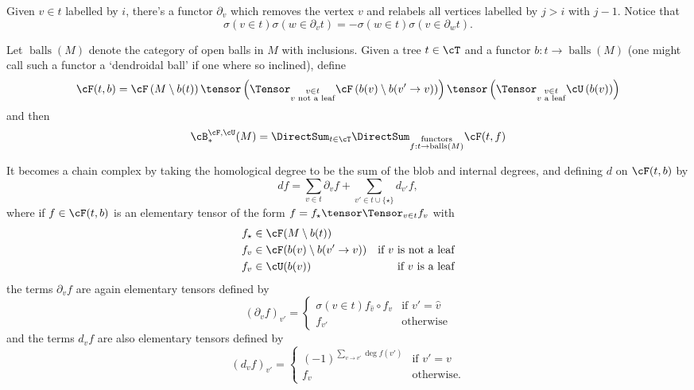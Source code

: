 Given $v \in t$ labelled by $i$, there's a functor $\partial_v$ which removes the vertex $v$ and relabels all vertices labelled by $j>i$ with $j-1$. Notice that $$\sigma(v \in t) \sigma(w \in \partial_v t) = - \sigma(w \in t) \sigma(v \in \partial_w t).$$

Let $\operatorname{balls}(M)$ denote the category of open balls in $M$ with inclusions.
Given a tree $t \in \cT$ and a functor $b : t \to \operatorname{balls}(M)$ (one might call such a functor a `dendroidal ball' if one where so inclined), define  
\begin{equation*}
\cF(t,b) = \cF\left(M \setminus b(t)\right) \tensor \left(\Tensor_{\substack{v \in t \\ \text{$v$ not a leaf}}} \cF\left(b(v) \setminus b(v' \to v)\right)\right) \tensor \left(\Tensor_{\substack{v \in t \\ \text{$v$ a leaf}}} \cU\left(b(v)\right)\right)
\end{equation*}
and then
\begin{equation*}
\cB_*^{\cF,\cU}(M) = \DirectSum_{t \in \cT} \DirectSum_{\substack{\text{functors} \\ f: t \to \operatorname{balls}(M)}} \cF(t,f)
\end{equation*}

It becomes a chain complex by taking the homological degree to be the sum of the blob and internal degrees, and defining $d$ on $\cF(t,b)$ by
\begin{equation*}
d f = \sum_{v \in t} \partial_v f + \sum_{v' \in t \cup \{\star\}} d_{v'} f,
\end{equation*}
where if $f \in \cF(t,b)$ is an elementary tensor of the form $f = f_\star \tensor \Tensor_{v \in t} f_v$ with
\begin{align*}
f_\star & \in \cF(M \setminus b(t)) & \\
f_v       & \in \cF(b(v) \setminus b(v' \to v)) & \text{if $v$ is not a leaf} \\
f_v       & \in \cU(b(v)) & \text{if $v$ is a leaf}
\end{align*}
the terms $\partial_v f$ are again elementary tensors defined by
\begin{equation*}
(\partial_v f)_{v'} = \begin{cases} \sigma(v \in t) f_{\hat{v}} \circ f_v & \text{if $v' = \hat{v}$} \\ f_{v'} & \text{otherwise} \end{cases}
\end{equation*}
and the terms $d_v f$ are also elementary tensors defined by
\begin{equation*}
(d_v f)_{v'} = \begin{cases} (-1)^{\sum_{v \to v'} \deg f(v')} & \text{if $v'=v$} \\ f_v & \text{otherwise.} \end{cases}
\end{equation*}




